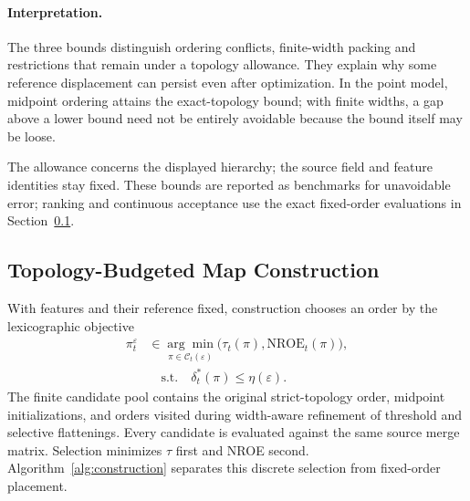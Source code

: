 \documentclass[review]{vgtc}
\newcommand{\nroe}{\mathrm{NROE}}
\begin{document}
\paragraph{Interpretation.}
The three bounds distinguish ordering conflicts, finite-width packing and restrictions that remain under a topology allowance. They explain why some reference displacement can persist even after optimization. In the point model, midpoint ordering attains the exact-topology bound; with finite widths, a gap above a lower bound need not be entirely avoidable because the bound itself may be loose. 

The allowance concerns the displayed hierarchy; the source field and feature identities stay fixed. These bounds are reported as benchmarks for unavoidable error; ranking and continuous acceptance use the exact fixed-order evaluations in Section~\ref{sec:construction}. 

\subsection{Topology-Budgeted Map Construction}\label{sec:construction}
With features and their reference fixed, construction chooses an order by the lexicographic objective
\begin{equation}\label{eq:orderobjective}
\begin{aligned}
 \pi_t^\varepsilon&\in\underset{\pi\in\mathcal{C}_t(\varepsilon)}{\arg\min}
                    \bigl(\tau_t(\pi),\nroe_t(\pi)\bigr),\\
 &\hspace{1em}\mathrm{s.t.}\quad\delta_t^*(\pi)\le\eta(\varepsilon).
\end{aligned}
\end{equation}
The finite candidate pool contains the original strict-topology order, midpoint initializations, and orders visited during width-aware refinement of threshold and selective flattenings. Every candidate is evaluated against the same source merge matrix. Selection minimizes $\tau$ first and NROE second. Algorithm~\ref{alg:construction} separates this discrete selection from fixed-order placement.
\end{document}

